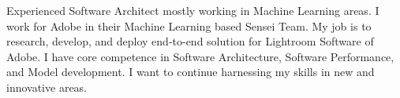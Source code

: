 \par{
Experienced Software Architect mostly working in Machine Learning areas. I work for Adobe in their Machine Learning based Sensei Team. My job is to research, develop, and deploy end-to-end solution for Lightroom Software of Adobe. I have core competence in Software Architecture, Software Performance, and Model development. I want to continue harnessing my skills in new and innovative areas.
}